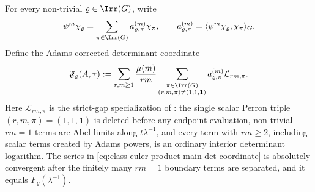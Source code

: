 \begin{theorem}
  For every non-trivial \(\varrho\in\Irr(G)\), write
  \[
    \psi^m\chi_\varrho
    =
    \sum_{\pi\in\Irr(G)}
      a_{\varrho,\pi}^{(m)}\chi_\pi ,
    \qquad
    a_{\varrho,\pi}^{(m)}
    =
    \langle\psi^m\chi_\varrho,\chi_\pi\rangle_G .
  \]
  Define the Adams-corrected determinant coordinate
  \begin{equation}\label{eq:class-euler-product-main-det-coordinate}
    \mathfrak F_\varrho(A,\tau)
    :=
    \sum_{r,m\ge1}\frac{\mu(m)}{rm}
      \sum_{\substack{\pi\in\Irr(G)\\(r,m,\pi)\neq(1,1,\mathbf1)}}
        a_{\varrho,\pi}^{(m)}\mathcal L_{rm,\pi}.
  \end{equation}
  Here \(\mathcal L_{rm,\pi}\) is the strict-gap specialization of
  : the single scalar Perron
  triple \((r,m,\pi)=(1,1,\mathbf1)\) is deleted before any endpoint
  evaluation, non-trivial \(rm=1\) terms are Abel limits along
  \(t\lambda^{-1}\), and every term with \(rm\ge2\), including scalar terms
  created by Adams powers, is an ordinary interior determinant logarithm.
  The series in \eqref{eq:class-euler-product-main-det-coordinate} is
  absolutely convergent after the finitely many \(rm=1\) boundary terms are
  separated, and it equals \(F_\varrho(\lambda^{-1})\).


\end{theorem}
